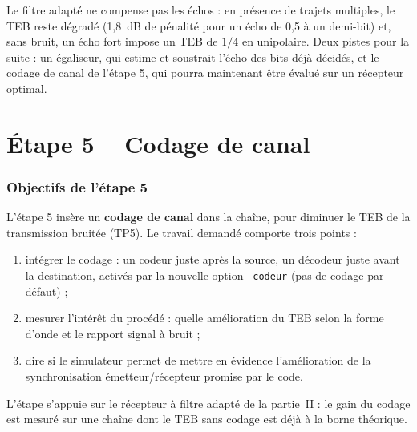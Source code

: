 \documentclass[11pt,a4paper]{article}
\begin{document}
Le filtre adapté ne compense pas les échos : en présence de trajets multiples, le TEB reste dégradé (1,8~dB de pénalité pour un écho de 0,5 à un demi-bit) et, sans bruit, un écho fort impose un TEB de $1/4$ en unipolaire. Deux pistes pour la suite : un égaliseur, qui estime et soustrait l'écho des bits déjà décidés, et le codage de canal de l'étape 5, qui pourra maintenant être évalué sur un récepteur optimal.


\part{Étape 5 -- Codage de canal}
\section{Objectifs de l'étape 5}
L'étape 5 insère un \textbf{codage de canal} dans la chaîne, pour diminuer le TEB de la transmission bruitée (TP5). Le travail demandé comporte trois points :
\begin{enumerate}
  \item intégrer le codage : un codeur juste après la source, un décodeur juste avant la destination, activés par la nouvelle option \texttt{-codeur} (pas de codage par défaut) ;
  \item mesurer l'intérêt du procédé : quelle amélioration du TEB selon la forme d'onde et le rapport signal à bruit ;
  \item dire si le simulateur permet de mettre en évidence l'amélioration de la synchronisation émetteur/récepteur promise par le code.
\end{enumerate}
L'étape s'appuie sur le récepteur à filtre adapté de la partie~II : le gain du codage est mesuré sur une chaîne dont le TEB sans codage est déjà à la borne théorique.
\end{document}
